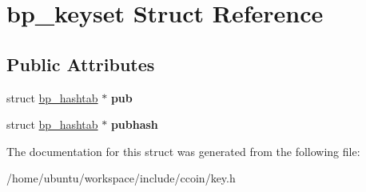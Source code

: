 \hypertarget{structbp__keyset}{\section{bp\-\_\-keyset Struct Reference}
\label{structbp__keyset}
}
\subsection*{Public Attributes}
\begin{DoxyCompactItemize}
\item 
\hypertarget{structbp__keyset_aa1317a5ad3af5b243504a0d650afd6ed}{struct \hyperlink{structbp__hashtab}{bp\-\_\-hashtab} $\ast$ {\bfseries pub}}\label{structbp__keyset_aa1317a5ad3af5b243504a0d650afd6ed}

\item 
\hypertarget{structbp__keyset_a23fa012be0b1424c876459a385644be4}{struct \hyperlink{structbp__hashtab}{bp\-\_\-hashtab} $\ast$ {\bfseries pubhash}}\label{structbp__keyset_a23fa012be0b1424c876459a385644be4}

\end{DoxyCompactItemize}


The documentation for this struct was generated from the following file\-:\begin{DoxyCompactItemize}
\item 
/home/ubuntu/workspace/include/ccoin/key.\-h\end{DoxyCompactItemize}
